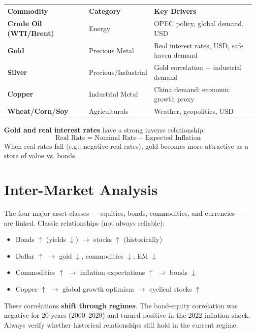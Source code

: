 \begin{center}
\begin{tabular}{>{\bfseries}p{3cm} p{4cm} p{6cm}}
\toprule
Commodity & Category & Key Drivers \\
\midrule
Crude Oil (WTI/Brent) & Energy & OPEC policy, global demand, USD \\
Gold & Precious Metal & Real interest rates, USD, safe haven demand \\
Silver & Precious/Industrial & Gold correlation + industrial demand \\
Copper & Industrial Metal & China demand; economic growth proxy \\
Wheat/Corn/Soy & Agriculturals & Weather, geopolitics, USD \\
\bottomrule
\end{tabular}
\end{center}

\textbf{Gold and real interest rates} have a strong inverse relationship:
\[
  \text{Real Rate} = \text{Nominal Rate} - \text{Expected Inflation}
\]
When real rates fall (e.g., negative real rates), gold becomes more attractive as a store
of value vs. bonds.

\section{Inter-Market Analysis}

The four major asset classes — equities, bonds, commodities, and currencies — are
linked. Classic relationships (not always reliable):

\begin{itemize}
  \item Bonds $\uparrow$ (yields $\downarrow$) $\rightarrow$ stocks $\uparrow$ (historically)
  \item Dollar $\uparrow$ $\rightarrow$ gold $\downarrow$, commodities $\downarrow$, EM $\downarrow$
  \item Commodities $\uparrow$ $\rightarrow$ inflation expectations $\uparrow$ $\rightarrow$ bonds $\downarrow$
  \item Copper $\uparrow$ $\rightarrow$ global growth optimism $\rightarrow$ cyclical stocks $\uparrow$
\end{itemize}

\begin{notebox}
These correlations \textbf{shift through regimes}. The bond-equity correlation was negative for
20 years (2000--2020) and turned positive in the 2022 inflation shock. Always verify
whether historical relationships still hold in the current regime.
\end{notebox}
